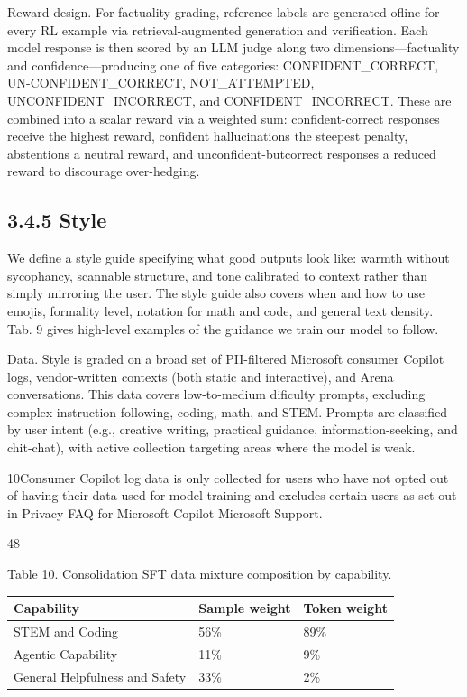 \documentclass[
  10
]{article}
\newcounter{none} %
\begin{document}
Reward design. For factuality grading, reference labels are generated
ofline for every RL example via retrieval-augmented generation and
verification. Each model response is then scored by an LLM judge along
two dimensions---factuality and confidence---producing one of five
categories: CONFIDENT\_CORRECT, UN-CONFIDENT\_CORRECT, NOT\_ATTEMPTED,
UNCONFIDENT\_INCORRECT, and CONFIDENT\_INCORRECT. These are combined
into a scalar reward via a weighted sum: confident-correct responses
receive the highest reward, confident hallucinations the steepest
penalty, abstentions a neutral reward, and unconfident-butcorrect
responses a reduced reward to discourage over-hedging.

\subsection{3.4.5 Style}\label{style}

We define a style guide specifying what good outputs look like: warmth
without sycophancy, scannable structure, and tone calibrated to context
rather than simply mirroring the user. The style guide also covers when
and how to use emojis, formality level, notation for math and code, and
general text density. Tab. 9 gives high-level examples of the guidance
we train our model to follow.

Data. Style is graded on a broad set of PII-filtered Microsoft consumer
Copilot logs, vendor-written contexts (both static and interactive), and
Arena conversations. This data covers low-to-medium dificulty prompts,
excluding complex instruction following, coding, math, and STEM. Prompts
are classified by user intent (e.g., creative writing, practical
guidance, information-seeking, and chit-chat), with active collection
targeting areas where the model is weak.

10Consumer Copilot log data is only collected for users who have not
opted out of having their data used for model training and excludes
certain users as set out in Privacy FAQ for Microsoft Copilot \textbar{}
Microsoft Support.

48

Table 10. Consolidation SFT data mixture composition by capability.

{\def\LTcaptype{none} %
\begin{longtable}[]{@{}|l|l|l|@{}}
\toprule\noalign{}
\endhead
\bottomrule\noalign{}
\endlastfoot
\hline
Capability & Sample weight & Token weight \\
\hline
STEM and Coding & 56\% & 89\% \\
\hline
Agentic Capability & 11\% & 9\% \\
\hline
General Helpfulness and Safety & 33\% & 2\% \\
\hline
\end{longtable}
}
\end{document}
